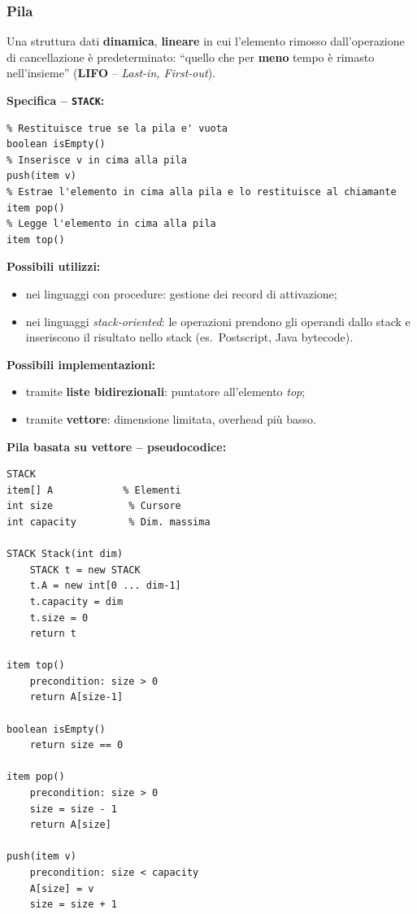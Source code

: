 \documentclass[12pt, a4paper]{article}
\begin{document}
\subsubsection{Pila}

\begin{tcolorbox}[colback=lightergray!10, colframe=tocsec, title=\textbf{Definizione: Pila (Stack)}]
\label{def:pila}
Una struttura dati \textbf{dinamica}, \textbf{lineare} in cui l'elemento rimosso dall'operazione di cancellazione è predeterminato: ``quello che per \textbf{meno} tempo è rimasto nell'insieme'' (\textbf{LIFO} -- \textit{Last-in, First-out}).
\end{tcolorbox}

\textbf{Specifica -- \texttt{STACK}:}
\begin{verbatim}
% Restituisce true se la pila e' vuota
boolean isEmpty()
% Inserisce v in cima alla pila
push(item v)
% Estrae l'elemento in cima alla pila e lo restituisce al chiamante
item pop()
% Legge l'elemento in cima alla pila
item top()
\end{verbatim}

\textbf{Possibili utilizzi:}
\begin{itemize}
    \item nei linguaggi con procedure: gestione dei record di attivazione;
    \item nei linguaggi \textit{stack-oriented}: le operazioni prendono gli operandi dallo stack e inseriscono il risultato nello stack (es.\ Postscript, Java bytecode).
\end{itemize}

\textbf{Possibili implementazioni:}
\begin{itemize}
    \item tramite \textbf{liste bidirezionali}: puntatore all'elemento \textit{top};
    \item tramite \textbf{vettore}: dimensione limitata, overhead più basso.
\end{itemize}

\textbf{Pila basata su vettore -- pseudocodice:}
\begin{verbatim}
STACK
item[] A            % Elementi
int size             % Cursore
int capacity         % Dim. massima

STACK Stack(int dim)
    STACK t = new STACK
    t.A = new int[0 ... dim-1]
    t.capacity = dim
    t.size = 0
    return t

item top()
    precondition: size > 0
    return A[size-1]

boolean isEmpty()
    return size == 0

item pop()
    precondition: size > 0
    size = size - 1
    return A[size]

push(item v)
    precondition: size < capacity
    A[size] = v
    size = size + 1
\end{verbatim}
\end{document}
